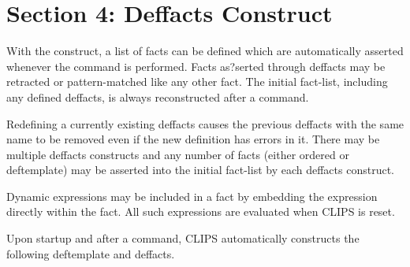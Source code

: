 \documentclass[letterpaper,10pt,english]{sphinxmanual}
\begin{document}
\chapter{Section 4: Deffacts Construct}
\label{\detokenize{deffacts:section-4-deffacts-construct}}\label{\detokenize{deffacts::doc}}
With the  construct, a list of facts can be defined which
are automatically asserted whenever the  command is performed.
Facts as?serted through deffacts may be retracted or pattern-matched
like any other fact. The initial fact-list, including any defined
deffacts, is always reconstructed after a  command.


\begin{sphinxVerbatim}[commandchars=\\\{\}]
  \PYG{p}{[}\PYG{p}{]}  
\end{sphinxVerbatim}

Redefining a currently existing deffacts causes the previous deffacts
with the same name to be removed even if the new definition has errors
in it. There may be multiple deffacts constructs and any number of facts
(either ordered or deftemplate) may be asserted into the initial
fact-list by each deffacts construct.

Dynamic expressions may be included in a fact by embedding the
expression directly within the fact. All such expressions are evaluated
when CLIPS is reset.


\begin{sphinxVerbatim}[commandchars=\\\{\}]
  
    
    
    
\end{sphinxVerbatim}

Upon startup and after a  command, CLIPS automatically
constructs the following deftemplate and deffacts.
\end{document}
